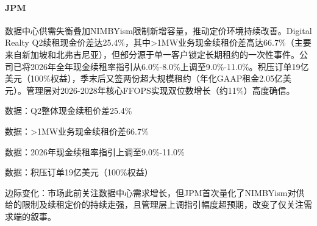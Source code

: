\documentclass[11pt]{ctexart}
\begin{document}
\paragraph{JPM} 数据中心供需失衡叠加NIMBYism限制新增容量，推动定价环境持续改善。Digital Realty Q2续租现金价差达25.4\%，其中>1MW业务现金续租价差高达66.7\%（主要来自新加坡和北弗吉尼亚），但部分源于单一客户锁定长期租约的一次性事件。公司已将2026年全年现金续租率指引从6.0\%-8.0\%上调至9.0\%-11.0\%。积压订单19亿美元（100\%权益），季末后又签两份超大规模租约（年化GAAP租金2.05亿美元）。管理层对2026-2028年核心FFOPS实现双位数增长（约11\%）高度确信。
{\small\color{refgray}数据：Q2整体现金续租价差25.4\%\par}
{\small\color{refgray}数据：>1MW业务现金续租价差66.7\%\par}
{\small\color{refgray}数据：2026年现金续租率指引上调至9.0\%-11.0\%\par}
{\small\color{refgray}数据：积压订单19亿美元（100\%权益）\par}
{\small\color{refgray}边际变化：市场此前关注数据中心需求增长，但JPM首次量化了NIMBYism对供给的限制及续租定价的持续走强，且管理层上调指引幅度超预期，改变了仅关注需求端的叙事。\par}
\end{document}
